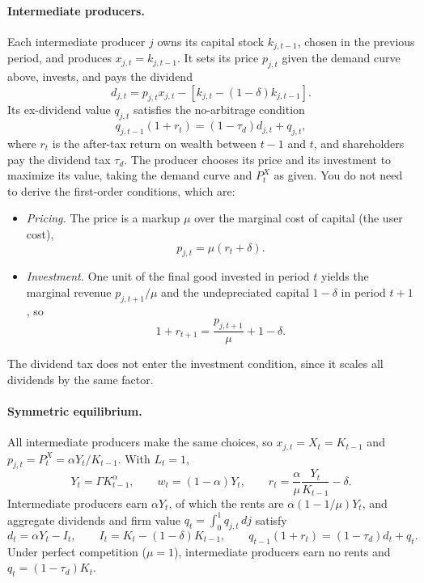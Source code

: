 \documentclass[12pt]{article}
\begin{document}
\paragraph*{Intermediate producers.}
Each intermediate producer $j$ owns its capital stock $k_{j,t-1}$, chosen in the previous period, and produces $x_{j,t}=k_{j,t-1}$. It sets its price $p_{j,t}$ given the demand curve above, invests, and pays the dividend
$$d_{j,t}=p_{j,t}x_{j,t}-\left[k_{j,t}-(1-\delta)k_{j,t-1}\right].$$
Its ex-dividend value $q_{j,t}$ satisfies the no-arbitrage condition
$$q_{j,t-1}(1+r_t)=(1-\tau_d)d_{j,t}+q_{j,t},$$
where $r_t$ is the after-tax return on wealth between $t-1$ and $t$, and shareholders pay the dividend tax $\tau_d$. The producer chooses its price and its investment to maximize its value, taking the demand curve and $P^X_t$ as given. You do not need to derive the first-order conditions, which are:
\begin{itemize}
\item \emph{Pricing.} The price is a markup $\mu$ over the marginal cost of capital (the user cost),
$$p_{j,t}=\mu\left(r_t+\delta\right).$$
\item \emph{Investment.} One unit of the final good invested in period $t$ yields the marginal revenue $p_{j,t+1}/\mu$ and the undepreciated capital $1-\delta$ in period $t+1$, so
$$1+r_{t+1}=\frac{p_{j,t+1}}{\mu}+1-\delta.$$
\end{itemize}
The dividend tax does not enter the investment condition, since it scales all dividends by the same factor.

\paragraph*{Symmetric equilibrium.}
All intermediate producers make the same choices, so $x_{j,t}=X_t=K_{t-1}$ and $p_{j,t}=P^X_t=\alpha Y_t/K_{t-1}$. With $L_t=1$,
$$Y_t=\Gamma K_{t-1}^{\alpha},\qquad w_t=(1-\alpha)Y_t,\qquad r_t=\frac{\alpha}{\mu}\frac{Y_t}{K_{t-1}}-\delta.$$
Intermediate producers earn $\alpha Y_t$, of which the rents are $\alpha(1-1/\mu)Y_t$, and aggregate dividends and firm value $q_t=\int_0^1 q_{j,t}\,dj$ satisfy
$$d_t=\alpha Y_t-I_t,\qquad I_t=K_t-(1-\delta)K_{t-1},\qquad q_{t-1}(1+r_t)=(1-\tau_d)d_t+q_t.$$
Under perfect competition ($\mu=1$), intermediate producers earn no rents and $q_t=(1-\tau_d)K_t$.
\end{document}
